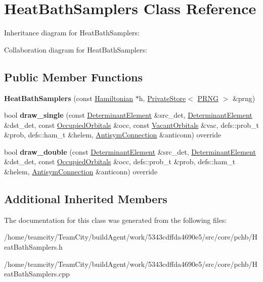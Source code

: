 \hypertarget{classHeatBathSamplers}{}\section{Heat\+Bath\+Samplers Class Reference}
\label{classHeatBathSamplers}


Inheritance diagram for Heat\+Bath\+Samplers\+:


Collaboration diagram for Heat\+Bath\+Samplers\+:
\subsection*{Public Member Functions}
\begin{DoxyCompactItemize}
\item 
{\bfseries Heat\+Bath\+Samplers} (const \hyperlink{classHamiltonian}{Hamiltonian} $\ast$h, \hyperlink{classPrivateStore}{Private\+Store}$<$ \hyperlink{classPRNG}{P\+R\+NG} $>$ \&prng)\hypertarget{classHeatBathSamplers_a6c301f6338de8229f2eb073d7e5fcf0d}{}\label{classHeatBathSamplers_a6c301f6338de8229f2eb073d7e5fcf0d}

\item 
bool {\bfseries draw\+\_\+single} (const \hyperlink{classDeterminantElement}{Determinant\+Element} \&src\+\_\+det, \hyperlink{classDeterminantElement}{Determinant\+Element} \&dst\+\_\+det, const \hyperlink{structOccupiedOrbitals}{Occupied\+Orbitals} \&occ, const \hyperlink{structVacantOrbitals}{Vacant\+Orbitals} \&vac, defs\+::prob\+\_\+t \&prob, defs\+::ham\+\_\+t \&helem, \hyperlink{classAntisymConnection}{Antisym\+Connection} \&anticonn) override\hypertarget{classHeatBathSamplers_a23a35dd94e61b5c6440f54cee19a9fff}{}\label{classHeatBathSamplers_a23a35dd94e61b5c6440f54cee19a9fff}

\item 
bool {\bfseries draw\+\_\+double} (const \hyperlink{classDeterminantElement}{Determinant\+Element} \&src\+\_\+det, \hyperlink{classDeterminantElement}{Determinant\+Element} \&dst\+\_\+det, const \hyperlink{structOccupiedOrbitals}{Occupied\+Orbitals} \&occ, defs\+::prob\+\_\+t \&prob, defs\+::ham\+\_\+t \&helem, \hyperlink{classAntisymConnection}{Antisym\+Connection} \&anticonn) override\hypertarget{classHeatBathSamplers_af8e17179f6ccdee991df488f29234b7c}{}\label{classHeatBathSamplers_af8e17179f6ccdee991df488f29234b7c}

\end{DoxyCompactItemize}
\subsection*{Additional Inherited Members}


The documentation for this class was generated from the following files\+:\begin{DoxyCompactItemize}
\item 
/home/teamcity/\+Team\+City/build\+Agent/work/5343cdffda4690e5/src/core/pchb/Heat\+Bath\+Samplers.\+h\item 
/home/teamcity/\+Team\+City/build\+Agent/work/5343cdffda4690e5/src/core/pchb/Heat\+Bath\+Samplers.\+cpp\end{DoxyCompactItemize}
